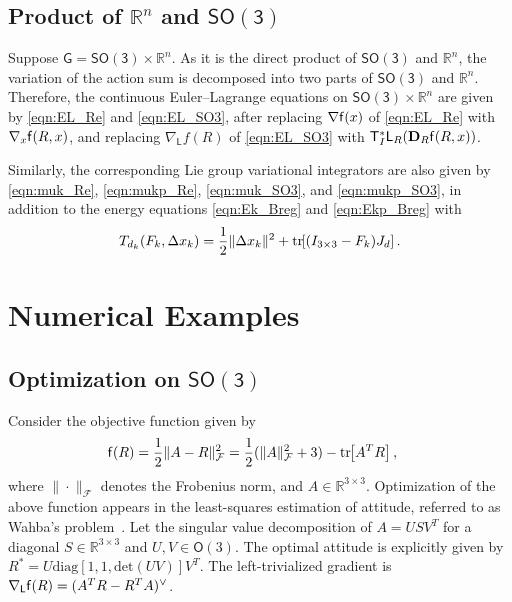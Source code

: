 \documentclass[letterpaper, 10pt, conference]{ieeeconf}
\newcommand{\bracket}[1]{\ensuremath{\left[ #1 \right]}}
\newcommand{\tr}[1]{\mbox{tr}\ensuremath{\negthickspace\bracket{#1}}}
\newcommand{\G}{\ensuremath{\mathsf{G}}}
\newcommand{\SO}{\ensuremath{\mathsf{SO(3)}}}
\newcommand{\T}{\ensuremath{\mathsf{T}}}
\renewcommand{\L}{\ensuremath{\mathsf{L}}}
\newcommand{\SE}{\ensuremath{\mathsf{SE(3)}}}
\renewcommand{\Re}{\ensuremath{\mathbb{R}}}
\newcommand{\D}{\ensuremath{\mathbf{D}}}
\begin{document}
\subsection{Product of $\Re^n$ and $\SO$}

Suppose $\G=\SO\times \Re^n$.
As it is the direct product of $\SO$ and $\Re^n$, the variation of the action sum is decomposed into two parts of $\SO$ and $\Re^n$. 
Therefore, the continuous Euler--Lagrange equations on $\SO\times\Re^n$ are given by \eqref{eqn:EL_Re} and \eqref{eqn:EL_SO3}, after replacing $\nabla \mathsf{f}(x)$ of \eqref{eqn:EL_Re} with $\nabla_x \mathsf{f}(R,x)$, and replacing $\nabla_\L f(R)$ of \eqref{eqn:EL_SO3} with $\T^*_I\L_R(\D_R\obj(R,x))$.

Similarly, the corresponding Lie group variational integrators are also given by \eqref{eqn:muk_Re}, \eqref{eqn:mukp_Re}, \eqref{eqn:muk_SO3}, and \eqref{eqn:mukp_SO3}, in addition to the energy equations \eqref{eqn:Ek_Breg} and \eqref{eqn:Ekp_Breg} with
\begin{align*}
    T_{d_k}(F_k,\Delta x_k) = \frac{1}{2}\|\Delta x_k\|^2 + \tr{(I_{3\times 3}-F_k)J_d}.
\end{align*}

\section{Numerical Examples}

\subsection{Optimization on $\SO$}

\label{sec:experimentA}

Consider the objective function given by
\begin{align}
    \obj (R) & = \frac{1}{2}\| A- R\|^2_{\mathcal{F}}  %
    =\frac{1}{2}(\|A\|^2_{\mathcal{F}} + 3) - \tr{A^T R},\label{eqn:obj_SO3}
\end{align}
where $\|\cdot\|_{\mathcal{F}}$ denotes the Frobenius norm, and $A\in\Re^{3\times 3}$.
Optimization of the above function appears in the least-squares estimation of attitude, referred to as Wahba's problem~\cite{WahSR65}. 
Let the singular value decomposition of $A=USV^T$ for a diagonal $S\in\Re^{3\times 3}$ and $U,V\in\mathsf{O}(3)$.
The optimal attitude is explicitly given by $R^* =  U \mathrm{diag}[1,1,\mathrm{det}(UV)] V^T$.
The left-trivialized gradient is $\nabla_\L \obj(R)  = (A^T R - R^T A)^\vee$.
\end{document}
